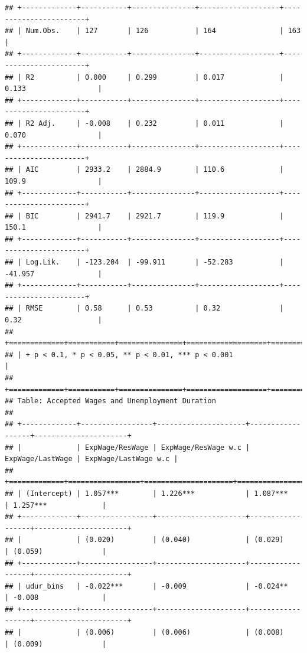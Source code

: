 \documentclass[
]{article}
\begin{document}
\begin{verbatim}
## +-------------+-----------+---------------+-------------------+-----------------------+
## | Num.Obs.    | 127       | 126           | 164               | 163                   |
## +-------------+-----------+---------------+-------------------+-----------------------+
## | R2          | 0.000     | 0.299         | 0.017             | 0.133                 |
## +-------------+-----------+---------------+-------------------+-----------------------+
## | R2 Adj.     | -0.008    | 0.232         | 0.011             | 0.070                 |
## +-------------+-----------+---------------+-------------------+-----------------------+
## | AIC         | 2933.2    | 2884.9        | 110.6             | 109.9                 |
## +-------------+-----------+---------------+-------------------+-----------------------+
## | BIC         | 2941.7    | 2921.7        | 119.9             | 150.1                 |
## +-------------+-----------+---------------+-------------------+-----------------------+
## | Log.Lik.    | -123.204  | -99.911       | -52.283           | -41.957               |
## +-------------+-----------+---------------+-------------------+-----------------------+
## | RMSE        | 0.58      | 0.53          | 0.32              | 0.32                  |
## +=============+===========+===============+===================+=======================+
## | + p < 0.1, * p < 0.05, ** p < 0.01, *** p < 0.001                                   |
## +=============+===========+===============+===================+=======================+
## Table: Accepted Wages and Unemployment Duration 
## 
## +-------------+-----------------+---------------------+------------------+----------------------+
## |             | ExpWage/ResWage | ExpWage/ResWage w.c | ExpWage/LastWage | ExpWage/LastWage w.c |
## +=============+=================+=====================+==================+======================+
## | (Intercept) | 1.057***        | 1.226***            | 1.087***         | 1.257***             |
## +-------------+-----------------+---------------------+------------------+----------------------+
## |             | (0.020)         | (0.040)             | (0.029)          | (0.059)              |
## +-------------+-----------------+---------------------+------------------+----------------------+
## | udur_bins   | -0.022***       | -0.009              | -0.024**         | -0.008               |
## +-------------+-----------------+---------------------+------------------+----------------------+
## |             | (0.006)         | (0.006)             | (0.008)          | (0.009)              |

\end{verbatim}
\end{document}

